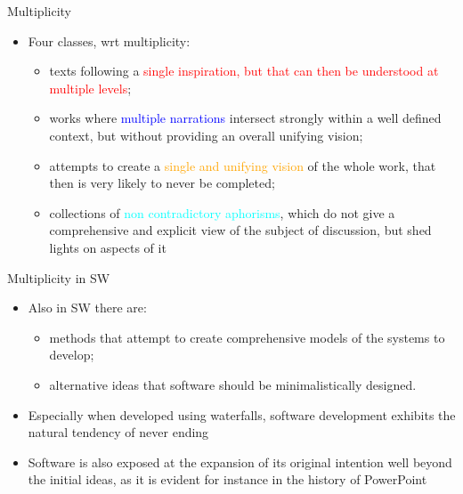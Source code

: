 \documentclass{beamer}
\begin{document}
\begin{frame}
{\centerline{Multiplicity}}
\begin{itemize}
    \item Four classes, wrt multiplicity:
    \begin{itemize}
        \item texts following a \textcolor{red}{single inspiration, but that can then be understood at multiple levels};
        \item works where \textcolor{blue}{multiple narrations} intersect strongly within a well defined context, but without providing an overall unifying vision;
        \item  attempts to create a \textcolor{orange}{single and unifying vision} of the whole work, that then is very likely to never be completed;
        \item collections of \textcolor{cyan}{non contradictory aphorisms}, which do not give a comprehensive and explicit view of the subject of discussion, but shed lights on aspects of it
    \end{itemize}

\end{itemize}   
\end{frame}

\begin{frame}
{\centerline{Multiplicity in SW}}
\begin{itemize}
    \item Also in SW there are:
    \begin{itemize}
        \item  methods that attempt to create comprehensive models of the systems to develop;
        \item  alternative ideas that software should be minimalistically designed. 
    \end{itemize}
    \item Especially when developed using waterfalls, software development exhibits the natural tendency of never ending
    \item Software is also exposed at the expansion of its original intention well beyond the initial ideas, as it is evident for instance in the history of PowerPoint
\end{itemize}   
\end{frame}
\end{document}
